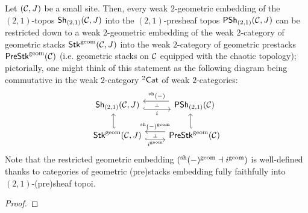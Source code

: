                     \begin{theorem} \label{theorem: (2,1)_sheafification_of_geometric_prestacks}
                        Let $(\mathcal{C}, J)$ be a small site. Then, every weak $2$-geometric embedding of the $(2, 1)$-topos $\mathsf{Sh}_{(2, 1)}(\mathcal{C}, J)$ into the $(2, 1)$-presheaf topos $\mathsf{PSh}_{(2, 1)}(\mathcal{C}, J)$ can be restricted down to a weak $2$-geometric embedding of the weak $2$-category of geometric stacks $\mathsf{Stk}^{\mathrm{geom}}(\mathcal{C}, J)$ into the weak $2$-category of geometric prestacks $\mathsf{Pre}\mathsf{Stk}^{\mathrm{geom}}(\mathcal{C})$ (i.e. geometric stacks on $\mathcal{C}$ equipped with the chaotic topology); pictorially, one might think of this statement as the following diagram being commutative in the weak $2$-category ${}^2\mathsf{Cat}$ of weak $2$-categories: 
                            $$
                                \begin{tikzcd}
                                	{\Sh_{(2, 1)}(\C, J)} & {\Psh_{(2, 1)}(\C)} \\
                                	{\Stk^{\geom}(\C, J)} & {\Pre\Stk^{\geom}(\C)}
                                	\arrow[""{name=0, anchor=center, inner sep=0}, "{{}^{\sh}(-)}"', shift right=2, shorten <=2pt, from=1-2, to=1-1]
                                	\arrow[""{name=1, anchor=center, inner sep=0}, "i"', shift right=2, hook, from=1-1, to=1-2]
                                	\arrow[shift left=2, hook', from=2-1, to=1-1]
                                	\arrow[shift left=2, hook', from=2-2, to=1-2]
                                	\arrow[""{name=2, anchor=center, inner sep=0}, "{i^{\geom}}"', shift right=2, hook, from=2-1, to=2-2]
                                	\arrow[""{name=3, anchor=center, inner sep=0}, "{{}^{\sh}(-)^{\geom}}"', shift right=2, from=2-2, to=2-1]
                                	\arrow["\dashv"{anchor=center, rotate=-90}, draw=none, from=0, to=1]
                                	\arrow["\dashv"{anchor=center, rotate=-90}, draw=none, from=3, to=2]
                                \end{tikzcd}
                            $$
                        Note that the restricted geometric embedding $({}^{\mathrm{sh}}(-)^{\mathrm{geom}} \dashv i^{\mathrm{geom}})$ is well-defined thanks to categories of geometric (pre)stacks embedding fully faithfully into $(2, 1)$-(pre)sheaf topoi.
                    \end{theorem}
                        \begin{proof}
                            
                        \end{proof}
